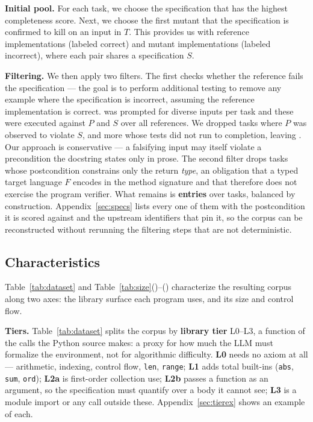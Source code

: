 \documentclass[11pt,letterpaper]{article}
\begin{document}
\textbf{Initial pool.}
For each task, we choose the specification that has the highest completeness score.
Next, we choose the first mutant that the specification is confirmed to kill on
an input in $T$.
This provides us with \dsonepairs{} reference implementations (labeled correct)
and \dsonepairs{} mutant implementations (labeled incorrect), where each pair
shares a specification $S$.

\textbf{Filtering.} We then apply two filters. The first checks
whether the reference fails the specification --- the goal is to 
perform additional testing to
remove any example where the specification is incorrect, assuming 
the reference implementation is correct. 
\dsgenmodel{} was prompted for \dsgentests{} diverse inputs per
task and these were executed against $P$ and $S$ over all \dstested{}
references. We dropped \dsspecfails{} tasks where $P$ was observed to violate
$S$, and \dsunconfirmed{} more whose tests did not run to completion, leaving
\dspassed{}. Our approach is conservative ---
a falsifying input may itself violate a precondition the docstring states only
in prose.
The second filter drops
\dstypeonly{} tasks whose postcondition constrains only the return \emph{type},
an obligation that a typed target language $F$ encodes in the method signature and
that therefore does not exercise the program verifier. 
What remains is \textbf{\dsentries{}
entries} over \dspairs{} tasks, balanced by construction.
Appendix~\ref{sec:specs} lists every one of them with the postcondition it is
scored against and the upstream identifiers that pin it, so the corpus can be
reconstructed without rerunning the filtering steps that are not
deterministic.




\subsection{Characteristics}
Table~\ref{tab:dataset} and
Table~\ref{tab:size}()--()
characterize the resulting corpus along two axes: the library surface each
program uses, and its size and control flow.

\textbf{Tiers.} Table~\ref{tab:dataset} splits the corpus by \textbf{library
tier} L0--L3, a function of the calls the Python source makes: a proxy for how
much the LLM must formalize the environment, not for algorithmic
difficulty. \textbf{L0} needs no axiom at all --- arithmetic, indexing, control
flow, \texttt{len}, \texttt{range}; \textbf{L1} adds total built-ins
(\texttt{abs}, \texttt{sum}, \texttt{ord}); \textbf{L2a} is first-order
collection use; \textbf{L2b} passes a function as an argument, so the
specification must quantify over a body it cannot see; \textbf{L3} is a module
import or any call outside these. Appendix~\ref{sec:tierex} shows an example of
each. 
\end{document}

